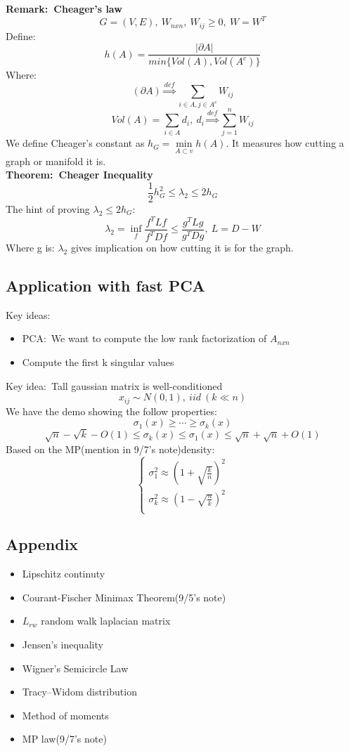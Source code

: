 \documentclass{article}
\begin{document}
\noindent
\textbf{Remark:~Cheager's law}
\[
G = (V,E),~W_{nxn},~W_{ij}{\geq}0,~W = W^T
\]
Define:
\[
h(A) = \frac{|\partial A|}{min \{Vol(A),Vol(A^c) \} }
\]
Where:
\[
(\partial A) \mathop{\Longrightarrow}\limits^{def} \sum_{i{\in}A,j{\in}A^c}W_{ij}
\]
\[
Vol(A) = \sum_{i{\in}A}d_i,~d_i\mathop{\Longrightarrow}\limits^{def}\sum_{j=1}^n W_{ij}
\]
We define Cheager's constant as $h_G = \mathop{min}\limits_{A\subset v} h(A)$. It measures how cutting a graph or manifold it is.\\

\noindent
\textbf{Theorem:~Cheager Inequality}
\[
\frac{1}{2}h_G^2{\leq}\lambda_2{\leq}2h_G
\]
The hint of proving $\lambda_2 {\leq} 2h_G$:
\[
\lambda_2 = \mathop{inf}\limits_f \frac{f^TLf}{f^TDf}{\leq}\frac{g^TLg}{g^TDg},~L = D- W
\]
Where g is:
$\lambda_2$ gives implication on how cutting it is for the graph.
\subsection{Application with fast PCA}
Key ideas:
\begin{itemize}
\item PCA:~We want to compute the low rank factorization of $A_{nxn}$ 
\item Compute the first k singular values \\
\end{itemize}
Key idea:~Tall gaussian matrix is well-conditioned
\[
x_{ij} \sim N(0,1),~iid~(k{\ll}n)
\]
We have the demo showing the follow properties:
\[
\sigma_1(x){\geq}{\cdots}{\geq}\sigma_k(x)
\]
\[
\sqrt{n} -\sqrt{k}-O(1){\leq}\sigma_k(x){\leq}\sigma_1(x){\leq}\sqrt{n}+\sqrt{n}+O(1)
\] 
Based on the MP(mention in 9/7's note)density:
\begin{equation}
\left\{
\begin{aligned}
\sigma_1^2 {\approx} (1+\sqrt{\frac{k}{n}})^2 \\
\sigma_k^2 {\approx} (1-\sqrt{\frac{n}{k}})^2 \\
\end{aligned}
\right.
\end{equation}

\subsection{Appendix}
\begin{itemize}
\item Lipschitz continuty
\item Courant-Fischer Minimax Theorem(9/5's note)
\item $L_{rw}$ random walk laplacian matrix 
\item Jensen's inequality
\item Wigner's Semicircle Law
\item Tracy–Widom distribution
\item Method of moments
\item MP law(9/7's note)
\end{itemize}
\end{document}
